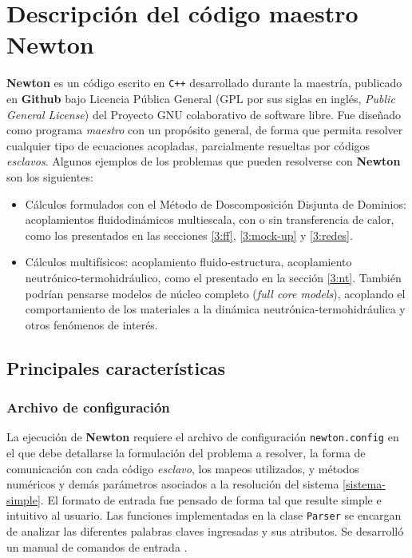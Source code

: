 \chapter{Descripción del código maestro \textbf{Newton}}
\label{C:newton}

\textbf{Newton} es un código escrito en \texttt{C++} desarrollado durante la maestría,
publicado en \textbf{Github} \cite{github} bajo Licencia Pública General (GPL por sus siglas en inglés, \textit{Public General License}) del Proyecto GNU colaborativo de software libre.
Fue diseñado como programa \textit{maestro} con un propósito general, de forma que permita resolver cualquier tipo de ecuaciones acopladas,
parcialmente resueltas por códigos \textit{esclavos}.
Algunos ejemplos de los problemas que pueden resolverse con \textbf{Newton} son los siguientes:
\begin{itemize}
\item Cálculos formulados con el Método de Doscomposición Disjunta de Dominios: 
acoplamientos fluidodinámicos multiescala, con o sin transferencia de calor, como los presentados en las secciones \ref{3:ff}, \ref{3:mock-up} y \ref{3:redes}.
\item Cálculos multifísicos: acoplamiento fluido-estructura, acoplamiento neutrónico-termohidráulico, como el presentado en la sección \ref{3:nt}.
También podrían pensarse modelos de núcleo completo (\textit{full core models}), acoplando el comportamiento de los materiales a la dinámica neutrónica-termohidráulica y otros fenómenos de interés.
\end{itemize}

\section{Principales características}
\label{ap2:main-features}

\subsection*{Archivo de configuración}
\label{ap2:parser}

La ejecución de \textbf{Newton} requiere el archivo de configuración \texttt{newton.config} en el que debe detallarse la formulación del problema a resolver,
la forma de comunicación con cada código \textit{esclavo}, los mapeos utilizados, y métodos numéricos y demás parámetros asociados a la resolución del sistema \ref{sistema-simple}.
El formato de entrada fue pensado de forma tal que resulte simple e intuitivo al usuario.
Las funciones implementadas en la clase \texttt{Parser} se encargan de analizar las diferentes palabras claves ingresadas y sus atributos.
Se desarrolló un manual de comandos de entrada \cite{newton-user-manual}.

